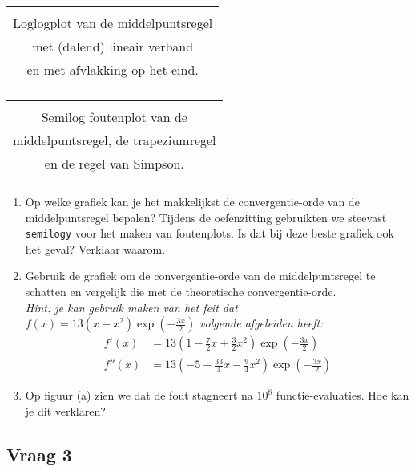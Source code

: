\documentclass[kulak]{kulakarticle}
\begin{document}
	\begin{table}[h!]
		\centering
		\begin{tabular}{|c|}
			\hline \\
			Loglogplot van de middelpuntsregel \\ met (dalend) lineair verband\\
			en met afvlakking op het eind. \\ \\\hline
		\end{tabular}
		\hspace{1cm}
		\begin{tabular}{|c|}
		\hline\\
		Semilog foutenplot van de \\
		middelpuntsregel, de trapeziumregel\\
		en de regel van Simpson.  \\ \\\hline
		\end{tabular}
	\end{table}

	\begin{enumerate}
		\item Op welke grafiek kan je het makkelijkst de convergentie-orde van de middelpuntsregel bepalen? Tijdens de oefenzitting gebruikten we steevast \texttt{semilogy} voor het maken van foutenplots. Is dat bij deze beste grafiek ook het geval? Verklaar waarom.

		\item Gebruik de grafiek om de convergentie-orde van de middelpuntsregel te schatten en vergelijk die met de theoretische convergentie-orde.\\
		\textit{Hint: je kan gebruik maken van het feit dat \(f(x)=13(x-x^2)\exp\left(-\frac{3x}{2}\right)\) volgende afgeleiden heeft:}
		\begin{align*}
			f'(x) &= 13\left(1-\frac{7}{2}x+\frac{3}{2}x^2\right) \exp\left(-\frac{3x}{2}\right)\\
			f''(x) &= 13\left(-5+\frac{33}{4}x-\frac{9}{4}x^2\right) \exp\left(-\frac{3x}{2}\right)
		\end{align*}

		\item Op figuur (a) zien we dat de fout stagneert na \(10^{8}\) functie-evaluaties. Hoe kan je dit verklaren?

	\end{enumerate}

	\newpage

	\subsection*{Vraag 3}
\end{document}
